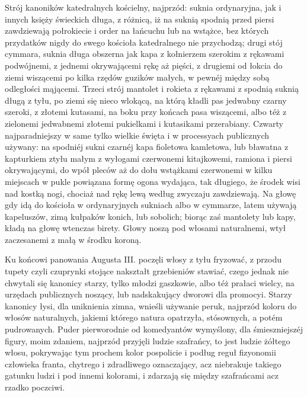 \documentclass{book}
\begin{document}
Strój kanoników katedralnych kościelny, najprzód: suknia ordynaryjna, jak i innych księży świeckich długa, z różnicą, iż na suknią spodnią przed piersi zawdziewają połrokiecie i order na łańcuchu lub na wstążce, bez których przydatków nigdy do swego kościoła katedralnego nie przychodzą; drugi stój cymmara, suknia długa obszerna jak kapa z kołnierzem szerokim z rękawami podwójnemi, z jednemi okrywającemi rękę aż pięści, z drugiemi od łokcia do ziemi wiszącemi po kilka rzędów guzików małych, w pewnéj między sobą odległości mąjącemi. Trzeci strój mantolet i rokieta z rękawami z spodnią suknią długą z tyłu, po ziemi się nieco wlokącą, na którą kładli pas jedwabny czarny szeroki, z złotemi kutasami, na boku przy końcach pasa wiszącemi, albo téż z zielonemi jedwabnemi złotemi pukielkami i kutasikami przerabiany. Czwarty najparadniejszy w same tylko wielkie święta i w processyach publicznych używany: na spodniéj sukni czarnéj kapa fioletowa kamletowa, lub bławatna z kapturkiem ztyłu małym z wyłogami czerwonemi kitajkowemi, ramiona i piersi okrywającymi, do wpół pleców aż do dołu wstążkami czerwonemi w kilku miejscach w pukle powiązana formę ogona wydająca, tak długiego, że środek wisi nad kostką nogi, chociaż nad rękę lewą według zwyczaju zawdziewają. Na głowę gdy idą do kościoła w ordynaryjnych sukniach albo w cymmarze, latem używają kapeluszów, zimą kułpaków konich, lub sobolich; biorąc zaś mantolety lub kapy, kładą na głowę wtenczas birety. Głowy noszą pod włosami naturalnemi, wtył zaczesanemi z małą w środku koroną.

Ku końcowi panowania Augusta III. poczęli włosy z tyłu fryzować, z przodu tupety czyli czuprynki stojące nakształt grzebieniów stawiać, czego jednak nie chwytali się kanonicy starzy, tylko młodzi gaszkowie, albo téż prałaci wielcy, na urzędach publicznych noszący, lub nadskakujący dworowi dla promocyi. Starzy kanonicy łysi, dla uniknienia zimna, wnieśli używanie peruk, najprzód koloru do włosów naturalnych, jakiemi którego natura opatrzyła, stósownych, a potém pudrowanych. Puder pierworodnie od komedyantów wymyślony, dla śmieszniejszéj figury, moim zdaniem, najprzód przyjęli ludzie szafrańcy, to jest ludzie żółtego włosu, pokrywając tym prochem kolor pospolicie i podług reguł fizyonomii człowieka franta, chytrego i zdradliwego oznaczający, acz niebrakuje takiego gatunku ludzi i pod innemi kolorami, i zdarzają się między szafrańcami acz rzadko poczciwi.
\end{document}

